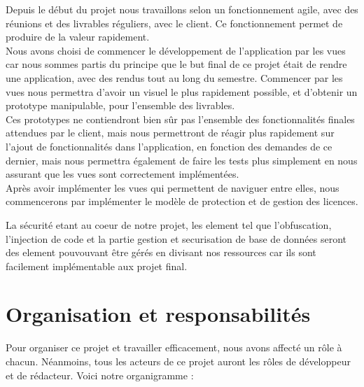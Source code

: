 Depuis le début du projet nous travaillons selon un fonctionnement agile, avec des
réunions et des livrables réguliers, avec le client. Ce fonctionnement permet de produire de
la valeur rapidement.\\ \newline
Nous avons choisi de commencer le développement de l’application par les vues car
nous sommes partis du principe que le but final de ce projet était de rendre une application,
avec des rendus tout au long du semestre. Commencer par les vues nous permettra d’avoir
un visuel le plus rapidement possible, et d’obtenir un prototype manipulable, pour l’ensemble
des livrables.\\ \newline
Ces prototypes ne contiendront bien sûr pas l’ensemble des fonctionnalités finales
attendues par le client, mais nous permettront de réagir plus rapidement sur l’ajout de
fonctionnalités dans l’application, en fonction des demandes de ce dernier, mais nous
permettra également de faire les tests plus simplement en nous assurant que
les vues sont correctement implémentées.\\ \newline
Après avoir implémenter les vues qui permettent de naviguer entre elles, nous
commencerons par implémenter le modèle de protection et de gestion des licences.\\ \newline

La sécurité etant au coeur de notre projet, les element tel que l'obfuscation, l'injection de code et la partie 
gestion et securisation de base de données seront des element pouvouvant être gérés en divisant nos ressources
car ils sont facilement implémentable aux projet final.

\chapter{Organisation et responsabilités}

Pour organiser ce projet et travailler efficacement, nous avons affecté un rôle à
chacun. Néanmoins, tous les acteurs de ce projet auront les rôles de développeur et de
rédacteur. Voici notre organigramme :\\ \newline



